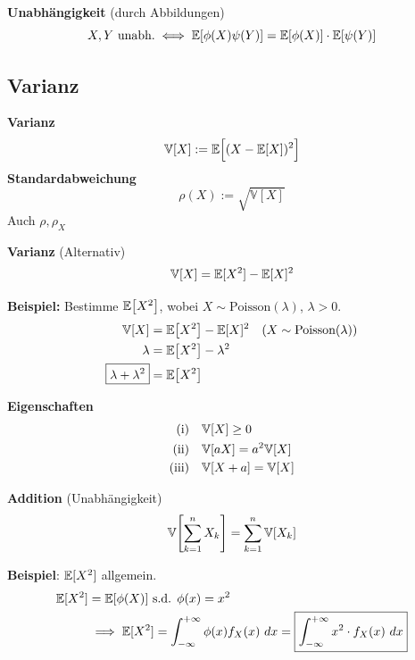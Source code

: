 \theorem \textbf{Unabhängigkeit} (durch Abbildungen)\\
$$
    X,Y \text{ unabh.} \iff \mathbb{E}[\phi(X)\psi(Y)] = \mathbb{E}[\phi(X)]\cdot\mathbb{E}[\psi(Y)]
$$

\newpage
\subsection{Varianz}

 \textbf{Varianz}\\ 
\subtext{$\E[X^2]<\infty$}
$$
    \mathbb{V}[X] := \mathbb{E}\Bigl[ (X - \mathbb{E}[X])^2 \Bigr]
$$
 \textbf{Standardabweichung}
$$
    \rho(X) := \sqrt{\mathbb{V}[X]}
$$
{\scriptsize
    \notation Auch $\rho, \rho_X$
}

\lemma \textbf{Varianz} (Alternativ)
$$
    \mathbb{V}[X] = \mathbb{E}[X^2]-\mathbb{E}[X]^2 
$$

{\footnotesize
    \textbf{Beispiel:} Bestimme $\mathbb{E}\bigl[X^2\bigr]$, wobei $X \sim \text{Poisson}(\lambda)$, $\lambda > 0$. 
    \begin{align*}
        \mathbb{V}[X]               &= \mathbb{E}\bigl[X^2\bigr] - \mathbb{E}[X]^2      & (X \sim \text{Poisson}(\lambda))      \\
        \lambda             &= \mathbb{E}\bigl[X^2\bigr] - \lambda^2                                            \\
        \boxed{\lambda + \lambda^2} &= \mathbb{E}\bigl[X^2\bigr]                                                        \\
    \end{align*}    
}

\lemma \textbf{Eigenschaften}
\begin{align*}
    \text{(i)}      &\quad \mathbb{V}[X]        \geq 0         \\
    \text{(ii)}     &\quad \mathbb{V}[aX]       = a^2\mathbb{V}[X]     \\
    \text{(iii)}    &\quad \mathbb{V}[X+a]      = \mathbb{V}[X]
\end{align*}

\lemma \textbf{Addition} (Unabhängigkeit)\\
$$
    \mathbb{V}\Biggl[ \sum_{k=1}^{n}X_k \Biggr] = \sum_{k=1}^{n}\mathbb{V}[X_k]
$$

{\scriptsize
    \textbf{Beispiel}: $\mathbb{E}[X^2]$ allgemein.
    \begin{align*}
        \mathbb{E}[X^2] &= \mathbb{E}[\phi(X)] \text{ s.d. } \phi(x) = x^2 \\
                &\implies \mathbb{E}[X^2] = \int_{-\infty}^{+\infty}\phi(x)f_X(x)\ dx = \boxed{\int_{-\infty}^{+\infty} x^2 \cdot f_X(x)\ dx}
    \end{align*}

}

